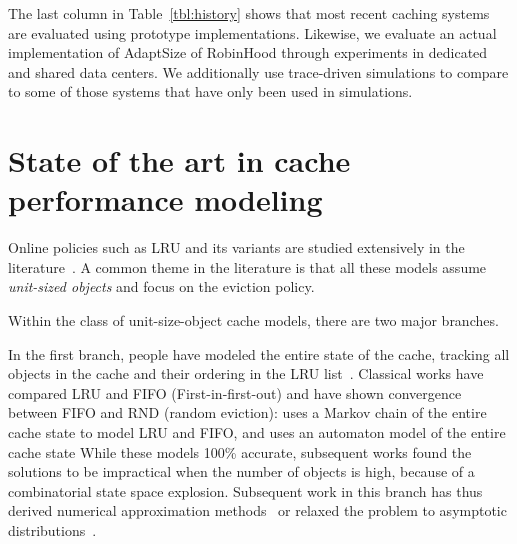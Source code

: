 \documentclass{article}
\begin{document}
The last column in Table~\ref{tbl:history} shows that most recent caching systems are evaluated using prototype implementations.
Likewise, we evaluate an actual implementation of AdaptSize of RobinHood through experiments in dedicated and shared data centers.
We additionally use trace-driven simulations to compare to some of those systems that have only been used in simulations.


\section{State of the art in cache performance modeling}\label{sec:bg:perfmodel}


Online policies such as LRU and its variants are studied extensively in the literature~\cite{king1971analysis,gelenbe1973unified,coffman1973operating,mccabe1965serial,burville1973model,hendricks1972stationary,dan1990,tsukada2012fluid,flajolet1992birthday,fill1996distribution,jelenkovic1999asymptotic,dobrow1995move,rodrigues1995performance,jelenkovic1999performance,jelenkovic2004least,panagakis2008approximate,psounis2004modeling,gallo2012performance,young2000line,o1999optimality,fricker2012versatile,martina13,Berger20142,gast2015transient,berger2015maximizing}.
A common theme in the literature is that all these models assume \emph{unit-sized objects} and focus on the eviction policy.

Within the class of unit-size-object cache models, there are two major branches.

In the first branch, people have modeled the entire state of the cache, tracking all objects in the cache and their ordering in the LRU list~\cite{king1971analysis,gelenbe1973unified,coffman1973operating,mccabe1965serial,burville1973model,hendricks1972stationary,flajolet1992birthday,fill1996distribution,dobrow1995move,rodrigues1995performance}.
Classical works have compared LRU and FIFO (First-in-first-out) and have shown convergence between FIFO and RND (random eviction): \cite{king1971analysis} uses a Markov chain of the entire cache state to model LRU and FIFO, and \cite{gelenbe1973unified} uses an automaton model of the entire cache state \cite{gelenbe1973unified}
While these models 100\% accurate, subsequent works found the solutions to be impractical when the number of objects is high, because of a combinatorial state space explosion.
Subsequent work in this branch has thus derived numerical approximation methods~\cite{dan1990,flajolet1992birthday,fill1996distribution} or relaxed the problem to asymptotic distributions~\cite{jelenkovic1999asymptotic,dobrow1995move,rodrigues1995performance,jelenkovic1999performance,jelenkovic2004least,olivier2013performance}.
\end{document}
